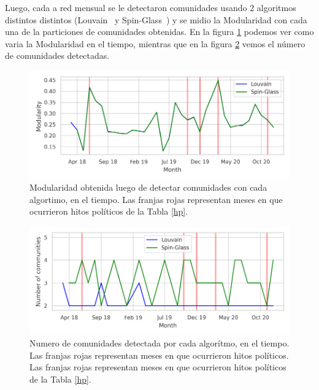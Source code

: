 \documentclass{proyectotesis}
\begin{document}
Luego, cada a red mensual se le detectaron comunidades usando 2 algoritmos distintos distintos (Louvain~\cite{Blondel_2008} y Spin-Glass~\cite{Reichardt_2006}) y se midio la Modularidad con cada una de la particiones de comunidades obtenidas. En la figura \ref{modfig} podemos ver como varia la Modularidad en el tiempo, mientras que en la figura \ref{N} vemos el número de comunidades detectadas.\\
\begin{figure}[h!]
    \centering
    \includegraphics[width=0.95\linewidth]{mod.pdf} 
    \vspace{-5mm}
    \caption{Modularidad obtenida luego de detectar comunidades con cada algortimo, en el tiempo. Las franjas rojas representan meses en que ocurrieron hitos políticos de la Tabla \ref{hp}.}
    \label{modfig}
\end{figure}
\begin{figure}[h!]
    \centering
    \includegraphics[width=0.95\linewidth]{N.pdf} 
    \vspace{-5mm}
    \caption{Numero de comunidades detectada por cada algorítmo, en el tiempo. Las franjas rojas representan meses en que ocurrieron hitos políticos. Las franjas rojas representan meses en que ocurrieron hitos políticos de la Tabla \ref{hp}.}
    \label{N}
\end{figure}

\renewcommand{\tablename}{Tabla}
\end{document}
